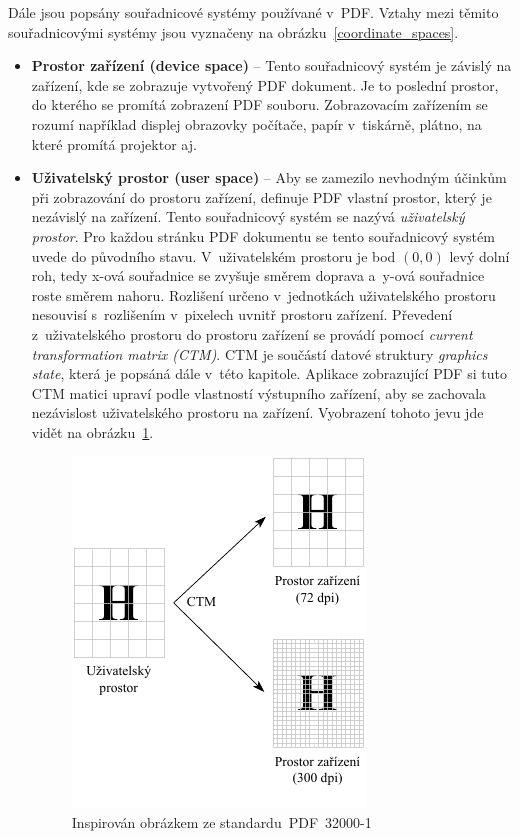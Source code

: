 Dále jsou popsány souřadnicové systémy používané v~PDF. Vztahy mezi těmito
souřadnicovými systémy jsou vyznačeny na obrázku~\ref{coordinate_spaces}.
\begin{itemize}
    \item \textbf{Prostor zařízení (device space)} -- Tento souřadnicový systém je
    závislý na zařízení, kde se zobrazuje vytvořený PDF dokument. Je to poslední
    prostor, do kterého se promítá zobrazení PDF souboru. Zobrazovacím zařízením
    se rozumí například displej obrazovky počítače, papír v~tiskárně, plátno, na
    které promítá projektor aj.
    
    \item \textbf{Uživatelský prostor (user space)} -- Aby se zamezilo nevhodným
    účinkům při zobrazování do prostoru zařízení, definuje PDF vlastní prostor,
    který je nezávislý na zařízení. Tento souřadnicový systém se nazývá
    \emph{uživatelský prostor}. Pro každou stránku PDF dokumentu se tento
    souřadnicový systém uvede do původního stavu. V~uživatelském prostoru je bod
    $(0, 0)$ levý dolní roh, tedy x-ová souřadnice se zvyšuje směrem
    doprava a~y-ová souřadnice roste směrem nahoru. Rozlišení určeno v~jednotkách
    uživatelského prostoru nesouvisí s~rozlišením v~pixelech uvnitř prostoru
    zařízení. Převedení z~uživatelského prostoru do prostoru zařízení se provádí
    pomocí \emph{current transformation matrix (CTM)}. CTM je součástí datové
    struktury \emph{graphics state}, která je popsáná dále v~této kapitole.
    Aplikace zobrazující PDF si tuto CTM matici upraví podle vlastností výstupního
    zařízení, aby se zachovala nezávislost uživatelského prostoru na zařízení. 
    Vyobrazení tohoto jevu jde vidět na obrázku~\ref{pic_user_to_device}.

    \begin{figure}[H]
        \centering
        \label{pic_user_to_device}
        \includegraphics[width=0.5\linewidth]{obrazky-figures/user_to_device_space.pdf}
        \caption{ Inspirován obrázkem ze standardu~PDF~32000-1~\cite{PDF32000-1:2008}}
    \end{figure}
    

\end{itemize}
